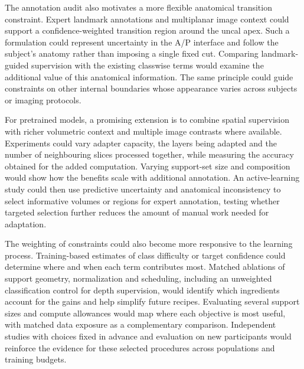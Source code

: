 \documentclass[12pt,a4paper]{article}
\begin{document}
The annotation audit also motivates a more flexible anatomical transition
constraint. Expert landmark annotations and multiplanar image context
could support a confidence-weighted transition region around the uncal
apex. Such a formulation could represent uncertainty in the A/P interface
and follow the subject's anatomy rather than imposing a single fixed
cut. Comparing landmark-guided supervision with the existing classwise
terms would examine the additional value of this anatomical information.
The same principle could guide constraints on other internal boundaries
whose appearance varies across subjects or imaging protocols.

For pretrained models, a promising extension is to combine spatial
supervision with richer volumetric context and multiple image contrasts
where available. Experiments could vary adapter capacity, the layers
being adapted and the number of neighbouring slices processed together,
while measuring the accuracy obtained for the added computation. Varying
support-set size and composition would show how the benefits scale with
additional annotation. An active-learning study could then use predictive
uncertainty and anatomical inconsistency to select informative volumes
or regions for expert annotation, testing whether targeted selection
further reduces the amount of manual work needed for adaptation.

The weighting of constraints could also become more responsive to the
learning process. Training-based estimates of class difficulty or target
confidence could determine where and when each term contributes most.
Matched ablations of support geometry, normalization and scheduling,
including an unweighted classification control for depth supervision,
would identify which ingredients account for the gains and help simplify
future recipes. Evaluating several support sizes and compute allowances
would map where each objective is most useful, with matched data exposure
as a complementary comparison. Independent studies with choices fixed in
advance and evaluation on new participants would reinforce the evidence
for these selected procedures across populations and training budgets.



\clearpage
\end{document}
